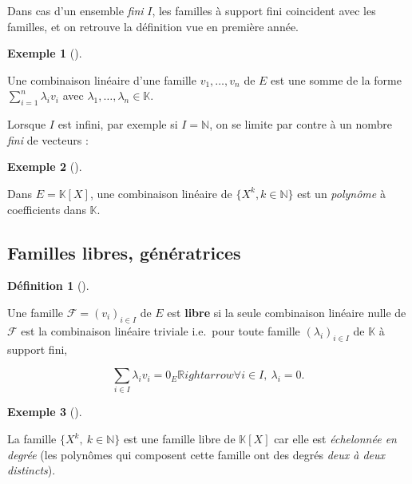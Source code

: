 \documentclass[
  french,
  letterpaper,
  DIV=11,
  numbers=noendperiod]{scrreprt}
\theoremstyle{plain}
\theoremstyle{definition}
\newtheorem{definition}{Définition}[chapter]
\theoremstyle{plain}
\theoremstyle{plain}
\theoremstyle{definition}
\theoremstyle{definition}
\newtheorem{example}{Exemple}[chapter]
\theoremstyle{plain}
\theoremstyle{remark}
\begin{document}
Dans cas d'un ensemble \emph{fini} \(I\), les familles à support fini
coincident avec les familles, et on retrouve la définition vue en
première année.

\begin{example}[]\protect\hypertarget{exm-cas-fini}{}\label{exm-cas-fini}

Une combinaison linéaire d'une famille \(v_1,\dots,v_{n}\) de \(E\) est
une somme de la forme \(\sum_{i=1}^{n}\lambda_{i}  v_{i}\) avec
\(\lambda_1,\dots,\lambda_{n}\in \mathbb{K}\).

\end{example}

Lorsque \(I\) est infini, par exemple si \(I=\mathbb{N}\), on se limite
par contre à un nombre \emph{fini} de vecteurs :

\begin{example}[]\protect\hypertarget{exm-polynome}{}\label{exm-polynome}

Dans \(E=\mathbb{K}[X]\), une combinaison linéaire de \(\{ X^{k}, k\in
\mathbb{N}\}\) est un \emph{polynôme} à coefficients dans
\(\mathbb{K}\).

\end{example}

\subsection{Familles libres,
génératrices}\label{familles-libres-guxe9nuxe9ratrices}

\begin{definition}[]\protect\hypertarget{def-famille-libre}{}\label{def-famille-libre}

Une famille \(\mathcal{F}=(v_{i})_{i \in I}\) de \(E\) est
\textbf{libre} si la seule combinaison linéaire nulle de \(\mathcal{F}\)
est la combinaison linéaire triviale i.e.~pour toute famille
\((\lambda_{i})_{i \in I}\) de \(\mathbb{K}\) à support fini,

\[
    \sum_{i \in I} \lambda_i v_{i} = 0_{E} \mathbb{R}ightarrow \forall i \in I,\
\lambda_{i}=0.
\]

\end{definition}

\begin{example}[]\protect\hypertarget{exm-famille-libre}{}\label{exm-famille-libre}

La famille \(\{X^{k},\ k \in \mathbb{N}\}\) est une famille libre de
\(\mathbb{K}[X]\) car elle est \emph{échelonnée en degrée} (les
polynômes qui composent cette famille ont des degrés \emph{deux à deux
distincts}).

\end{example}
\end{document}
